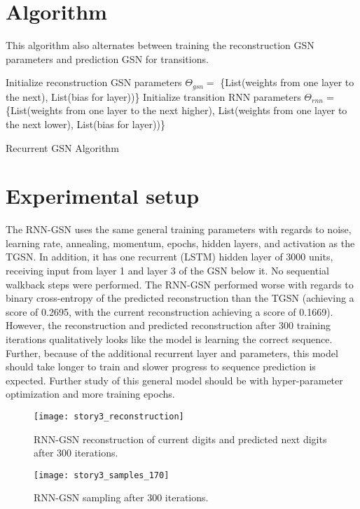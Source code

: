 \section{Algorithm}
This algorithm also alternates between training the reconstruction GSN parameters and prediction GSN for transitions.
 \begin{algorithm}[h!]
	Initialize reconstruction GSN parameters \(\Theta_{gsn} = \) \{List(weights from one layer to the next), List(bias for layer))\}\;
	Initialize transition RNN parameters \(\Theta_{rnn} = \) \{List(weights from one layer to the next higher), List(weights from one layer to the next lower), List(bias for layer))\}\;
	\caption{ Recurrent GSN Algorithm }
\end{algorithm}


\section{Experimental setup}
The RNN-GSN uses the same general training parameters with regards to noise, learning rate, annealing, momentum, epochs, hidden layers, and activation as the TGSN. In addition, it has one recurrent (LSTM) hidden layer of 3000 units, receiving input from layer 1 and layer 3 of the GSN below it. No sequential walkback steps were performed. The RNN-GSN performed worse with regards to binary cross-entropy of the predicted reconstruction than the TGSN (achieving a score of 0.2695, with the current reconstruction achieving a score of 0.1669). However, the reconstruction and predicted reconstruction after 300 training iterations qualitatively looks like the model is learning the correct sequence. Further, because of the additional recurrent layer and parameters, this model should take longer to train and slower progress to sequence prediction is expected. Further study of this general model should be with hyper-parameter optimization and more training epochs.

\begin{figure}[h!]
  \centering
    \texttt{[image: story3\_reconstruction]}
\caption{RNN-GSN reconstruction of current digits and predicted next digits after 300 iterations.}
\end{figure}

\begin{figure}[h!]
  \centering
    \texttt{[image: story3\_samples\_170]}
\caption{RNN-GSN sampling after 300 iterations.}
\end{figure}